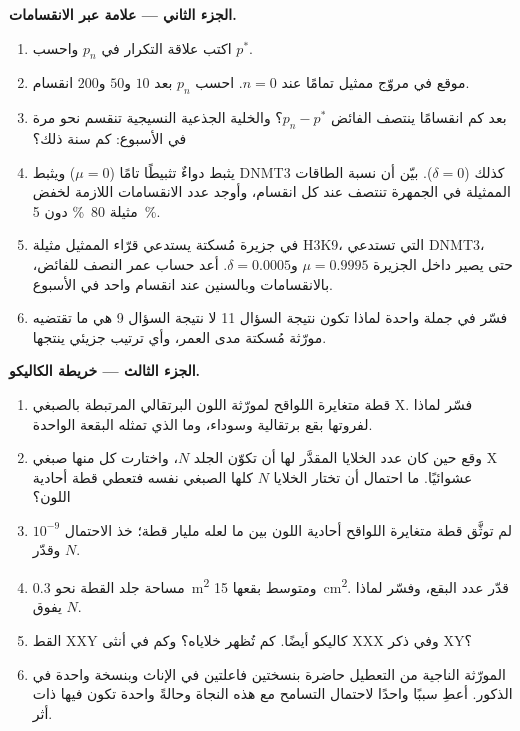 \begin{problem}
\medskip
\noindent\textbf{الجزء الثاني --- علامة عبر الانقسامات.}
\begin{enumerate}[resume]
  \item اكتب علاقة التكرار في $p_{n}$ واحسب $p^{*}$.
  \item موقع  في مروّج ممثيل تمامًا عند $n = 0$. احسب $p_{n}$ بعد
        $10$ و$50$ و$200$ انقسام.
  \item بعد كم انقسامًا ينتصف الفائض $p_{n} - p^{*}$؟ والخلية الجذعية
        النسيجية تنقسم نحو مرة في الأسبوع: كم سنة ذلك؟
  \item يثبط دواءٌ  تثبيطًا تامًا ($\mu = 0$) ويثبط DNMT3 كذلك
        ($\delta = 0$). بيّن أن نسبة الطاقات الممثيلة في الجمهرة
        تنتصف عند كل انقسام، وأوجد عدد الانقسامات اللازمة لخفض مثيلة
        \qty{80}{\%} دون \qty{5}{\%}.
  \item في جزيرة مُسكتة يستدعي قرّاء  الممثيل مثيلة H3K9، التي
        تستدعي DNMT3، حتى يصير داخل الجزيرة
        $\mu = 0.9995$ و$\delta = 0.0005$. أعد حساب عمر النصف
        للفائض، بالانقسامات وبالسنين عند انقسام واحد في الأسبوع.
  \item فسّر في جملة واحدة لماذا تكون نتيجة السؤال 11 لا نتيجة
        السؤال 9 هي ما تقتضيه مورّثة مُسكتة مدى العمر، وأي ترتيب
        جزيئي ينتجها.
\end{enumerate}

\medskip
\noindent\textbf{الجزء الثالث --- خريطة الكاليكو.}
\begin{enumerate}[resume]
  \item قطة متغايرة اللواقح لمورّثة اللون البرتقالي المرتبطة بالصبغي X.
        فسّر لماذا لفروتها بقع برتقالية وسوداء، وما الذي تمثله
        البقعة الواحدة.
  \item وقع  حين كان عدد الخلايا المقدَّر لها أن تكوّن الجلد
        $N$، واختارت كل منها صبغي X عشوائيًا. ما احتمال أن تختار
        الخلايا $N$ كلها الصبغي نفسه فتعطي قطة أحادية اللون؟
  \item لم توثَّق قطة متغايرة اللواقح أحادية اللون بين ما لعله مليار
        قطة؛ خذ الاحتمال $10^{-9}$ وقدّر $N$.
  \item مساحة جلد القطة نحو \qty{0.3}{m^2} ومتوسط بقعها
        \qty{15}{cm^2}. قدّر عدد البقع، وفسّر لماذا يفوق $N$.
  \item القط XXY كاليكو أيضًا. كم  تُظهر خلاياه؟ وكم في أنثى
        XXX وفي ذكر XY؟
  \item المورّثة الناجية من التعطيل حاضرة بنسختين فاعلتين في الإناث
        وبنسخة واحدة في الذكور. أعطِ سببًا واحدًا لاحتمال التسامح مع
        هذه النجاة وحالةً واحدة تكون فيها ذات أثر.
\end{enumerate}


\end{problem}

